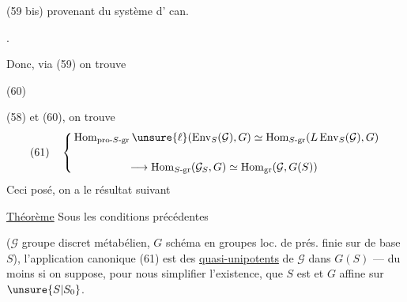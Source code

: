 (59 bis)\quad
{}
provenant du système d' can.


.

Donc, via (59) on trouve

(60)\quad
{}


 (58) et (60), on trouve
\[
(61)\quad\left\{
\begin{aligned}
&\operatorname{Hom}_{\mathrm{pro}\text{-}S\text{-}\mathrm{gr}}\unsure{\ell}
 (\operatorname{Env}_S(\mathcal{G}),G)
 \simeq\operatorname{Hom}_{S\text{-}\mathrm{gr}}(L\operatorname{Env}_S(\mathcal{G}),G)\\[1.2em]
&\hspace{5em}\longrightarrow\operatorname{Hom}_{S\text{-}\mathrm{gr}}(\mathcal{G}_S,G)
 \simeq\operatorname{Hom}_{\mathrm{gr}}(\mathcal{G},G(S))
\end{aligned}\right.
\]
Ceci posé, on a le résultat suivant

\uline{Théorème}  Sous les conditions précédentes

($\mathcal{G}$ groupe discret métabélien, $G$ schéma en groupes loc. de prés. finie sur  de base $S$), l'application canonique (61) est    des  \uline{quasi-unipotents} de $\mathcal{G}$ dans $G(S)$ --- du moins si on suppose, pour nous simplifier l'existence, que $S$ est  et $G$ affine sur $\unsure{S|S_0}$.

